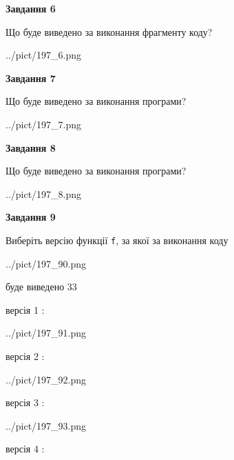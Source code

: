 \documentclass[12pt, ukrainian]{article}
\def\code#1{\Verb!#1!}
\begin{document}
{\begin {large}
{\begin {center}\textbf{Завдання 6}\end {center}}

Що буде виведено за виконання фрагменту коду?\par
\begin{center}
	{../pict/197_6.png}
\end{center}
\newpage

{\begin {center}\textbf{Завдання 7}\end {center}}

Що буде виведено за виконання програми?\par
\begin{center}
	{../pict/197_7.png}
\end{center}
\newpage

{\begin {center}\textbf{Завдання 8}\end {center}}

Що буде виведено за виконання програми?\par
\begin{center}
	{../pict/197_8.png}
\end{center}
\newpage

{\begin {center}\textbf{Завдання 9}\end {center}}

Виберіть версію функції \code{f}, за якої за виконання коду
\begin{center}
	{../pict/197_90.png}
\end{center}
буде виведено 33

\vspace{5mm}
версія 1 :

\begin{center}
	{../pict/197_91.png}
\end{center}
версія 2 :

\begin{center}
	{../pict/197_92.png}
\end{center}
версія 3 :

\begin{center}
	{../pict/197_93.png}
\end{center}
версія 4 :


\end{large}}
\end{document}
